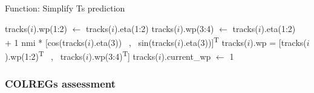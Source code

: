 
\begin{algorithm}[ht]
    \caption{Function: Simplify \gls{Ts} prediction} \label{ALG: Simplify Tracks}
    \begin{algorithmic}
                \State tracks($i$).wp(1:2) $\gets$ tracks($i$).eta(1:2)
                \State tracks($i$).wp(3:4) $\gets$ tracks($i$).eta(1:2) \\ \hfill + 1 nmi * [cos(tracks($i$).eta(3)) \ , \ sin(tracks($i$).eta(3))]\textsuperscript{T}
                \State tracks($i$).wp = [tracks($i$).wp(1:2)\textsuperscript{T} \ , \ tracks($i$).wp(3:4)\textsuperscript{T}]
                \State tracks($i$).current\_wp $\gets$ 1
            \EndIf
        \EndFor
    \end{algorithmic}
\end{algorithm}



\subsubsection*{COLREGs assessment}

